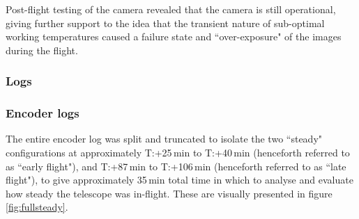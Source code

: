 Post-flight testing of the camera revealed that the camera is still operational, giving further support to the idea that the transient nature of sub-optimal working temperatures caused a failure state and ``over-exposure" of the images during the flight. 

\newpage
\subsubsection{Logs}

\subsubsection*{Encoder logs}
The entire encoder log was split and truncated to isolate the two ``steady" configurations at approximately T:+25\,min to T:+40\,min (henceforth referred to as ``early flight"), and T:+87\,min to T:+106\,min (henceforth referred to as ``late flight"), to give approximately 35\,min total time in which to analyse and evaluate how steady the telescope was in-flight. These are visually presented in figure \ref{fig:fullsteady}.

